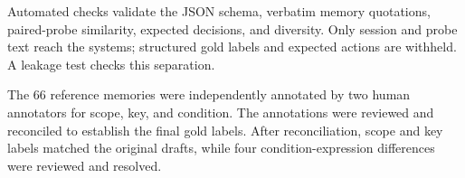 Automated checks validate the JSON schema, verbatim
memory quotations, paired-probe similarity, expected
decisions, and diversity. Only session and probe text
reach the systems; structured gold labels and expected
actions are withheld. A leakage test checks this
separation.

The 66 reference memories were independently annotated
by two human annotators for scope, key, and condition.
The annotations were reviewed and reconciled to establish
the final gold labels. After reconciliation, scope and key
labels matched the original drafts, while four
condition-expression differences were reviewed and resolved. 

